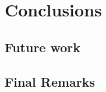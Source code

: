 \chapter{Conclusions}
\label{chap:conclusions}

\textcolor{dimgray}{\lipsum[1-4]}

\section{Future work}
\label{sec:future-work}

\textcolor{dimgray}{\lipsum[1-3]}

\section{Final Remarks}
\label{sec:final-remarks}

\textcolor{dimgray}{\lipsum[1]}